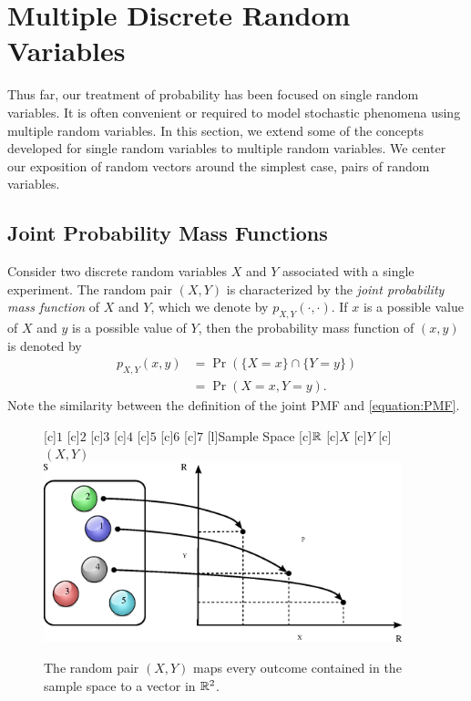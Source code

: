 \chapter{Multiple Discrete Random Variables}
\label{chapter:RandomVectorsDiscrete}

Thus far, our treatment of probability has been focused on single random variables.
It is often convenient or required to model stochastic phenomena using multiple random variables.
In this section, we extend some of the concepts developed for single random variables to multiple random variables.
We center our exposition of random vectors around the simplest case, pairs of random variables.


\section{Joint Probability Mass Functions}

Consider two discrete random variables $X$ and $Y$ associated with a single experiment.
The random pair $(X, Y)$ is characterized by the \emph{joint probability mass function} of $X$ and $Y$, which we denote by $p_{X,Y}(\cdot,\cdot)$. 
If $x$ is a possible value of $X$ and $y$ is a possible value of $Y$, then the probability mass function of $(x, y)$ is denoted by
\begin{equation*}
\begin{split}
p_{X,Y} (x, y) &= \Pr ( \{ X = x \} \cap \{ Y = y \} ) \\
&= \Pr ( X = x, Y = y ).
\end{split}
\end{equation*}
Note the similarity between the definition of the joint PMF and \eqref{equation:PMF}.

\begin{figure}[ht]
\begin{center}
\begin{psfrags}
[c]{$1$}
[c]{$2$}
[c]{$3$}
[c]{$4$}
[c]{$5$}
[c]{$6$}
[c]{$7$}
[l]{Sample Space}
[c]{$\mathbb{R}$}
[c]{$X$}
[c]{$Y$}
[c]{$(X,Y)$}
\includegraphics[height=5.20cm]{Figures/7Chapter/prv}
\end{psfrags}
\caption{The random pair $(X, Y)$ maps every outcome contained in the sample space to a vector in $\mathbb{R}^2$.}
\end{center}
\end{figure}

